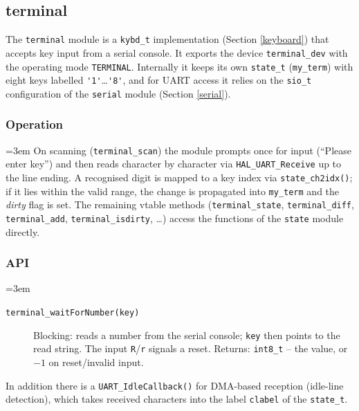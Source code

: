 \subsection{terminal}\label{terminal}
The \verb|terminal| module is a \verb|kybd_t| implementation (Section
\ref{keyboard}) that accepts key input from a serial console. It exports the
device \verb|terminal_dev| with the operating mode \verb|TERMINAL|. Internally
it keeps its own \verb|state_t| (\verb|my_term|) with eight keys labelled
\verb|'1'|\dots\verb|'8'|, and for UART access it relies on the
\verb|sio_t| configuration of the \verb|serial| module (Section \ref{serial}).

\subsubsection*{Operation}
{\sloppy\emergencystretch=3em
On scanning (\verb|terminal_scan|) the module prompts once for input
(``Please enter key'') and then reads character by character via
\verb|HAL_UART_Receive| up to the line ending. A recognised digit is mapped to
a key index via \verb|state_ch2idx()|; if it lies within the valid range, the
change is propagated into \verb|my_term| and the \emph{dirty} flag is set. The
remaining vtable methods (\verb|terminal_state|, \verb|terminal_diff|,
\verb|terminal_add|, \verb|terminal_isdirty|, \dots) access the functions of
the \verb|state| module directly.
\par}

\subsubsection*{API}
{\sloppy\emergencystretch=3em
\begin{description}
\item[\texttt{terminal\_waitForNumber(key)}] Blocking: reads a number from the
  serial console; \verb|key| then points to the read string. The input
  \verb|R|/\verb|r| signals a reset. Returns: \verb|int8_t| -- the value, or
  $-1$ on reset/invalid input.
\end{description}
\par}

\noindent In addition there is a \verb|UART_IdleCallback()| for DMA-based
reception (idle-line detection), which takes received characters into the
label \verb|clabel| of the \verb|state_t|.
